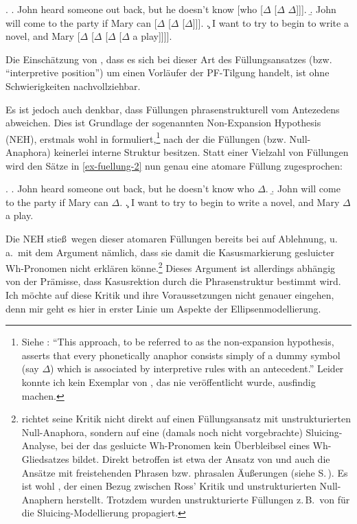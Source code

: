 \ex. \label{ex-fuellung-2}
\a. John heard someone out back, but he doesn't know [who [$\Delta$ [$\Delta$ $\Delta$]]]. %
\b. John will come to the party if Mary can [$\Delta$ [$\Delta$ [$\Delta$]]].  \hfill \citep[(31)]
{Wasow:72}
\c. I want to try to begin to write a novel, and Mary [$\Delta$ [$\Delta$ [$\Delta$ [$\Delta$  a play]]]].\label{ex-fuellung-2-c}

Die Einschätzung von \citet[6]{Winkler:Schwabe:03}, dass es sich bei dieser Art des Füllungsansatzes (bzw. "`interpretive position"') um einen Vorläufer der PF-Tilgung handelt, ist ohne Schwierigkeiten nachvollziehbar. 
 
Es ist jedoch auch denkbar, dass Füllungen phrasenstrukturell vom Antezedens abweichen. Dies ist Grundlage der sogenannten Non-Expansion Hypothesis (NEH), erstmals wohl in \cite{Akmajian:68} formuliert,\footnote{Siehe \citet[94]{Wasow:72}: "`This approach, to be referred to as the non-expansion hypothesis, asserts that every phonetically anaphor consists simply of a dummy symbol (say $\Delta$) which is associated by interpretive rules with an antecedent."' Leider konnte ich kein Exemplar von \cite{Akmajian:68}, das nie veröffentlicht wurde, ausfindig machen.} nach der die Füllungen (bzw. Null-Anaphora) keinerlei interne Struktur besitzen. Statt einer Vielzahl von Füllungen wird den Sätze in \ref{ex-fuellung-2} nun genau eine atomare Füllung zugesprochen: 

\ex. \label{ex-fuellung-3}
\a. \label{ex-fuellung-3-a}John heard someone out back, but he doesn't know who $\Delta$.
\b. \label{ex-fuellung-3-b}John will come to the party if Mary can $\Delta$.
\c. \label{ex-fuellung-3-c}I want to try to begin to write a novel, and Mary $\Delta$ a play.

Die NEH stie\ss\ wegen dieser atomaren Füllungen bereits bei \cite{Ross:69} auf Ablehnung, u.\,a.\ mit dem Argument nämlich, dass sie damit die Kasusmarkierung gesluicter Wh-Pronomen nicht  erklären könne.\footnote{\cite{Ross:69} richtet seine Kritik nicht direkt auf einen Füllungsansatz mit unstrukturierten Null-Anaphora, sondern auf eine (damals noch nicht vorgebrachte) Sluicing-Analyse, bei der das gesluicte Wh-Pronomen kein Überbleibsel eines Wh-Gliedsatzes bildet. Direkt betroffen ist etwa der Ansatz von \cite{Riemsdijk:78} und auch die Ansätze mit freistehenden Phrasen bzw. phrasalen Äu\ss erungen (siehe S.\,\pageref{ex-freistehende-phrasen}). Es ist wohl \cite{Wasow:72}, der einen Bezug zwischen Ross' Kritik und unstrukturierten Null-Anaphern herstellt. Trotzdem wurden unstrukturierte Füllungen z.\,B.\ von \cite{Chung:etal:95} für die Sluicing-Modellierung propagiert. } Dieses Argument ist allerdings abhängig von der Prämisse, dass Kasusrektion durch die Phrasenstruktur bestimmt wird. Ich möchte auf diese Kritik und ihre Voraussetzungen nicht genauer eingehen, denn mir geht es hier in erster Linie um Aspekte der Ellipsenmodellierung. 
 
